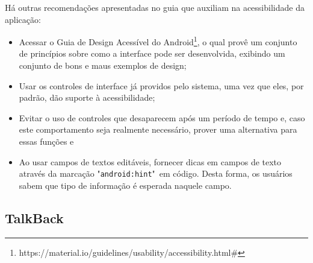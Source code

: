 Há outras recomendações apresentadas no guia que auxiliam na acessibilidade da aplicação:
\begin{itemize}
	\item Acessar o Guia de Design Acessível do Android\footnote{https://material.io/guidelines/usability/accessibility.html\#}, o qual provê um conjunto de princípios sobre como a interface pode ser desenvolvida, exibindo um conjunto de bons e maus exemplos de design;
	\item Usar os controles de interface já providos pelo sistema, uma vez que eles, por padrão, dão suporte à acessibilidade;
	\item Evitar o uso de controles que desaparecem após um período de tempo e, caso este comportamento seja realmente necessário, prover uma alternativa para essas funções e
	\item Ao usar campos de textos editáveis, fornecer dicas em campos de texto através da marcação "\texttt{android:hint}"\ em código. Desta forma, os usuários sabem que tipo de informação é esperada naquele campo.
\end{itemize}

\subsection{TalkBack}

